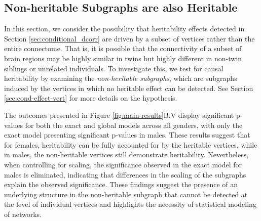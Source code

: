 \subsection{Non-heritable Subgraphs are also Heritable} \label{sec:subgraphs}
In this section, we consider the possibility that heritability effects detected in Section \ref{sec:conditional_dcorr} are driven by a subset of vertices rather than the entire connectome. That is, it is possible that the connectivity of a subset of brain regions may be highly similar in twins but highly different in non-twin siblings or unrelated individuals. To investigate this, we test for causal heritability by examining the \textit{non-heritable subgraphs}, which are subgraphs induced by the vertices in which no heritable effect can be detected. See Section \ref{sec:cond-effect-vert} for more details on the hypothesis.

The outcomes presented in Figure \ref{fig:main-results}B.V display significant p-values for both the exact and global models across all genders, with only the exact model presenting significant p-values in males. These results suggest that for females, heritability can be fully accounted for by the heritable vertices, while in males, the non-heritable vertices still demonstrate heritability. Nevertheless, when controlling for scaling, the significance observed in the exact model for males is eliminated, indicating that differences in the scaling of the subgraphs explain the observed significance. These findings suggest the presence of an underlying structure in the non-heritable subgraph that cannot be detected at the level of individual vertices and highlights the necessity of statistical modeling of networks.